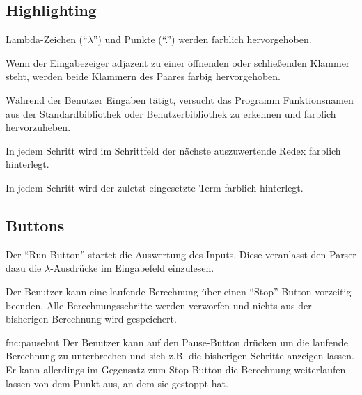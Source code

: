 \documentclass[parskip=full,11pt,twoside]{scrartcl}
\begin{document}
\subsection{Highlighting}

Lambda-Zeichen (\enquote{$\lambda$}) und Punkte (\enquote{.}) werden farblich hervorgehoben.

Wenn der Eingabezeiger adjazent zu einer öffnenden oder schließenden Klammer steht, werden beide Klammern des Paares farbig hervorgehoben.

Während der Benutzer Eingaben tätigt, versucht das Programm Funktionsnamen aus der Standardbibliothek oder Benutzerbibliothek zu erkennen und farblich hervorzuheben.

In jedem Schritt wird im Schrittfeld der nächste auszuwertende Redex farblich hinterlegt.

In jedem Schritt wird der zuletzt eingesetzte Term farblich hinterlegt.




\subsection{Buttons}

Der \enquote{Run-Button} startet die Auswertung des Inputs. Diese veranlasst den Parser dazu die $\lambda$-Ausdrücke im Eingabefeld einzulesen.

Der Benutzer kann eine laufende Berechnung über einen \enquote{Stop}-Button vorzeitig beenden. Alle Berechnungsschritte werden verworfen und nichts aus der bisherigen Berechnung wird gespeichert.

 {fnc:pausebut}
Der Benutzer kann auf den Pause-Button drücken um die laufende Berechnung zu unterbrechen und sich z.B. die bisherigen Schritte anzeigen lassen. Er kann allerdings im Gegensatz zum Stop-Button die Berechnung weiterlaufen lassen von dem Punkt aus, an dem sie gestoppt hat.
\end{document}
